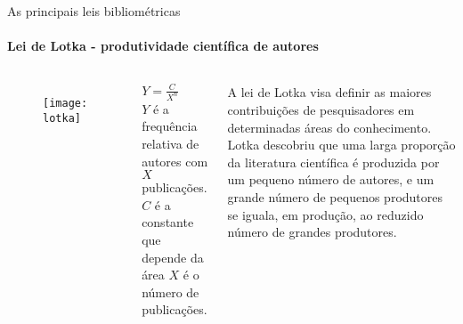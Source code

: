 \begin{frame}[t]{As principais leis bibliométricas}
    \framesubtitle{Lei de Lotka - produtividade científica de autores}



    \begin{columns}

        \begin{figure}
            \texttt{[image: lotka]}
        \end{figure}

        \centering
        $Y = \frac{C}{X^n}$\\
        $Y$ \scriptsize{é a frequência relativa de autores com $X$ publicações.}\\
        $C$ \scriptsize{é a constante que depende da área $X$ é o número de publicações.}

        A lei de Lotka visa definir as maiores contribuições de pesquisadores em determinadas áreas do conhecimento.\\
        Lotka descobriu que uma larga proporção da literatura científica é produzida por um pequeno número de autores, e um grande número de pequenos produtores se iguala, em produção, ao reduzido número de grandes produtores.
    \end{columns}

    \vspace*{0.2cm}

\end{frame}

